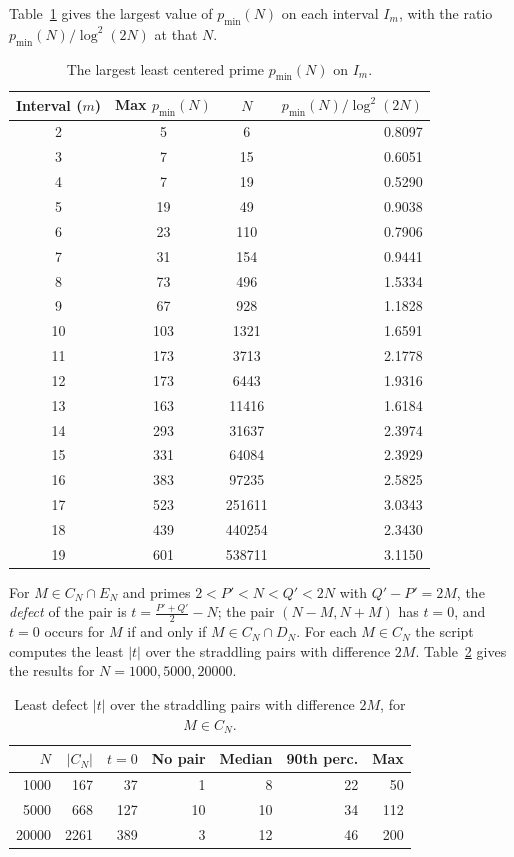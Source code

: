 \documentclass[11pt]{amsart}
\theoremstyle{definition}
\theoremstyle{remark}
\begin{document}
Table~\ref{tab:pmin} gives the largest value of $p_{\min}(N)$ on each interval $I_m$, with the ratio $p_{\min}(N)/\log^2(2N)$ at that $N$.
\begin{table}[H]
\caption{The largest least centered prime $p_{\min}(N)$ on $I_m$.}
\label{tab:pmin}
\small
\begin{tabularx}{\textwidth}{cccr}
\hline
\textbf{Interval ($m$)} & \textbf{Max $p_{\min}(N)$} & \textbf{$N$} & \textbf{$p_{\min}(N)/\log^2(2N)$} \\
\hline
2 & 5 & 6 & 0.8097 \\
3 & 7 & 15 & 0.6051 \\
4 & 7 & 19 & 0.5290 \\
5 & 19 & 49 & 0.9038 \\
6 & 23 & 110 & 0.7906 \\
7 & 31 & 154 & 0.9441 \\
8 & 73 & 496 & 1.5334 \\
9 & 67 & 928 & 1.1828 \\
10 & 103 & 1321 & 1.6591 \\
11 & 173 & 3713 & 2.1778 \\
12 & 173 & 6443 & 1.9316 \\
13 & 163 & 11416 & 1.6184 \\
14 & 293 & 31637 & 2.3974 \\
15 & 331 & 64084 & 2.3929 \\
16 & 383 & 97235 & 2.5825 \\
17 & 523 & 251611 & 3.0343 \\
18 & 439 & 440254 & 2.3430 \\
19 & 601 & 538711 & 3.1150 \\
\hline
\end{tabularx}
\end{table}
For $M\in C_N\cap E_N$ and primes $2<P'<N<Q'<2N$ with $Q'-P'=2M$, the \emph{defect} of the pair is $t=\frac{P'+Q'}{2}-N$; the pair $(N-M,N+M)$ has $t=0$, and $t=0$ occurs for $M$ if and only if $M\in C_N\cap D_N$. For each $M\in C_N$ the script computes the least $|t|$ over the straddling pairs with difference $2M$. Table~\ref{tab:defect} gives the results for $N=1000,5000,20000$.
\begin{table}[H]
\caption{Least defect $|t|$ over the straddling pairs with difference $2M$, for $M\in C_N$.}
\label{tab:defect}
\small
\begin{tabularx}{\textwidth}{rrrrrrr}
\hline
\textbf{$N$} & \textbf{$|C_N|$} & \textbf{$t=0$} & \textbf{No pair} & \textbf{Median} & \textbf{90th perc.} & \textbf{Max} \\
\hline
1000 & 167 & 37 & 1 & 8 & 22 & 50 \\
5000 & 668 & 127 & 10 & 10 & 34 & 112 \\
20000 & 2261 & 389 & 3 & 12 & 46 & 200 \\
\hline
\end{tabularx}
\end{table}
\end{document}
